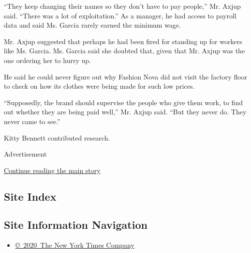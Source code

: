 ``They keep changing their names so they don't have to pay people,'' Mr.
Axjup said. ``There was a lot of exploitation.'' As a manager, he had
access to payroll data and said Ms. Garcia rarely earned the minimum
wage.

Mr. Axjup suggested that perhaps he had been fired for standing up for
workers like Ms. Garcia. Ms. Garcia said she doubted that, given that
Mr. Axjup was the one ordering her to hurry up.

He said he could never figure out why Fashion Nova did not visit the
factory floor to check on how its clothes were being made for such low
prices.

``Supposedly, the brand should supervise the people who give them work,
to find out whether they are being paid well,'' Mr. Axjup said. ``But
they never do. They never came to see.''

Kitty Bennett contributed research.

Advertisement

\protect\hyperlink{after-bottom}{Continue reading the main story}

\hypertarget{site-index}{%
\subsection{Site Index}\label{site-index}}

\hypertarget{site-information-navigation}{%
\subsection{Site Information
Navigation}\label{site-information-navigation}}

\begin{itemize}
\tightlist
\item
  \href{https://help.nytimes3xbfgragh.onion/hc/en-us/articles/115014792127-Copyright-notice}{©~2020~The
  New York Times Company}
\end{itemize}

